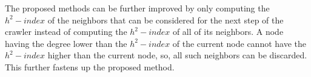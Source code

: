 \documentclass[conference]{IEEEtran}
\begin{document}
%																			
%																			
%																			
%																			
%																			
%																			
%																			
%																			
%																			
%																			
%
%																	


The proposed methods can be further improved by only computing the $h^2-index$ of the neighbors that can be considered for the next step of the crawler instead of computing the $h^2-index$ of all of its neighbors. A node having the degree lower than the $h^2-index$ of the current node cannot have the $h^2-index$ higher than the current node, so, all such neighbors can be discarded. This further fastens up the proposed method. 

\end{document}
